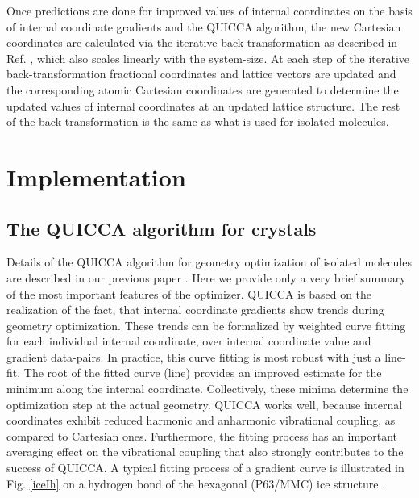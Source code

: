 \documentclass[prl,aps,preprint,superbib,12pt]{revtex4}
\begin{document}
Once predictions are done for improved values of internal coordinates
on the basis of internal coordinate gradients and the QUICCA 
\cite{KNemeth04} algorithm, the new Cartesian coordinates 
are calculated via the iterative back-transformation
as described in Ref. , which also scales 
linearly with the system-size. At each step of the iterative 
back-transformation fractional coordinates and lattice vectors
are updated and the corresponding atomic Cartesian coordinates are
generated to determine the updated values of internal coordinates
at an updated lattice structure. The rest of the back-transformation
is the same as what is used for isolated molecules.

\section{Implementation}

\subsection{The QUICCA algorithm for crystals} \label{QUICCAreview}
Details of the QUICCA algorithm for geometry optimization 
of isolated molecules are 
described in our previous paper \cite{KNemeth04}. Here we provide 
only a very brief summary of the most important features of the 
optimizer.
QUICCA is based on the realization of the fact, that internal coordinate
gradients show trends during geometry optimization.
These trends can be formalized by weighted curve fitting for each 
individual internal coordinate, over internal coordinate value and 
gradient data-pairs.
In practice, this curve fitting is most robust with just a line-fit. 
The root of the
fitted curve (line) provides an improved estimate for the minimum
along the internal coordinate. Collectively, these minima determine
the optimization step at the actual geometry.
QUICCA works well, because internal coordinates exhibit  
reduced harmonic and anharmonic vibrational coupling, as
compared to Cartesian ones. Furthermore, the fitting process
has an important averaging effect on the vibrational coupling
that also strongly contributes to the success of QUICCA.
A typical fitting process of a gradient curve is illustrated in 
Fig. \ref{iceIh} on a hydrogen bond of the hexagonal (P63/MMC)
ice structure \cite{AGoto90}.
\end{document}
